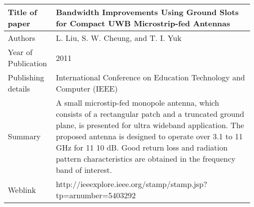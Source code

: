 \documentclass[12pt]{article}
\begin{document}
   \begin{table}
   	\begin{tabular}{ |l|p{11cm}| }
   		\hline
   		Title of paper &  Bandwidth Improvements Using Ground Slots for Compact UWB Microstrip-fed Antennas \\
   		\hline
   		Authors & L. Liu, S. W. Cheung, and T. I. Yuk \\
   		\hline
   		Year of Publication & 2011 \\
   		\hline
   		Publishing details & International Conference on Education Technology and Computer (IEEE) \\ \hline
   		Summary & A small microstip-fed monopole antenna, which consists of a rectangular patch and a truncated ground plane, is presented for ultra wideband application. The proposed antenna is designed to operate over 3.1 to 11 GHz for 11 10 dB. Good return loss and radiation pattern characteristics are obtained in the frequency band of interest.\\
   		\hline
   		Weblink & http://ieeexplore.ieee.org/stamp/stamp.jsp?tp=arnumber=5403292 \\
   		\hline			 
   	\end{tabular}		
   	
   \end{table}
\end{document}
